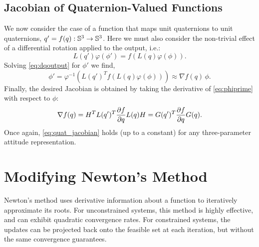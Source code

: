 \documentclass[../root.tex]{subfiles}
\begin{document}
    \subsection{Jacobian of Quaternion-Valued Functions} \label{sec:quatquat_jacobian}
        We now consider the case of a function that maps unit quaternions to unit
        quaternions, $q' = f(q) : \mathbb{S}^3 \to \mathbb{S}^3$. 
        Here we must also consider the non-trivial
        effect of a differential rotation applied to the output, i.e.:
        \begin{equation} \label{eq:dqoutput}
            L(q') \varphi(\phi') = f(L(q)\varphi(\phi)) .
        \end{equation}
        Solving \eqref{eq:dqoutput} for $\phi'$ we find,
        \begin{equation} \label{eq:phiprime}
            \phi' = \varphi^{-1} \left( L(q')^T f(L(q)\varphi(\phi)) \right) \approx \nabla f(q) \, \phi.
        \end{equation}
        Finally, the desired Jacobian is obtained by taking the derivative of
        \eqref{eq:phiprime} with respect to $\phi$:
        \begin{equation} \label{eq:quat_jacobian}
            \nabla f(q) = H^T L(q')^T \pdv{f}{q} L(q) H = G(q')^T \pdv{f}{q} G(q).
        \end{equation}
        Once again, \eqref{eq:quat_jacobian} holds (up to a constant) for any
        three-parameter attitude representation.
        

\section{Modifying Newton's Method} \label{sec:Wahbas}

    Newton's method uses derivative information about a function to iteratively
    approximate its roots. For unconstrained systems, this method is highly effective,
    and can exhibit quadratic convergence rates. For constrained systems, the updates 
    can be projected back onto the feasible set at each iteration, but without the same
    convergence guarantees.
    
\end{document}
